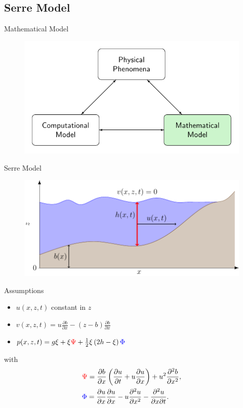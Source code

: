 \documentclass[pdf]{beamer}
\begin{document}
\subsection{Serre Model}
\begin{frame}{Mathematical Model}
	\begin{figure}
		\includegraphics[width=\textwidth]{./Pics/ModelDiagrams/FlowChartHigh2G.pdf}
	\end{figure}
\end{frame}
\begin{frame}{Serre Model}
	\begin{figure}
		\includegraphics[width=\textwidth]{./Pics/WaterModelDiagrams/SWWE.pdf}
	\end{figure}
\end{frame}
\begin{frame}{Assumptions}
	\begin{itemize}
		\item $u(x,z,t)$ constant in $z$
		\item $v(x,z,t) = u\frac{\partial b}{\partial x} - (z - b)\frac{\partial b}{\partial x}$
		\item $p(x,z,t) = g\xi  + \xi { \color{red}\Psi } + \frac{1}{2} \xi \left(2h - \xi\right) { \color{blue} \Phi }$
	\end{itemize}
		with
		\begin{align*}
		&{ \color{red}\Psi }  = \dfrac{\partial b}{\partial x}\left(\dfrac{\partial u}{\partial t} + u\dfrac{\partial u}{\partial x} \right)  + u^2\dfrac{\partial^2 b}{\partial x^2}, \\&
		{ \color{blue} \Phi }  = \dfrac{\partial u }{\partial x} \dfrac{\partial u}{\partial x} -u \dfrac{\partial^2 u}{\partial x^2}  - \dfrac{\partial^2 u}{\partial x \partial t} .
		\end{align*}
\end{frame}
\end{document}
